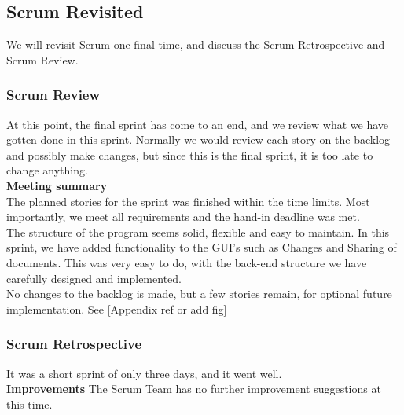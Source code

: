 \subsection{Scrum Revisited}
We will revisit Scrum one final time, and discuss the Scrum Retrospective and Scrum Review.
\subsubsection{Scrum Review}
At this point, the final sprint has come to an end, and we review what we have gotten done in this sprint. Normally we would review each story on the backlog and possibly make changes, but since this is the final sprint, it is too late to change anything.\\
\newline
\textbf{Meeting summary}\\
The planned stories for the sprint was finished within the time limits. Most importantly, we meet all requirements and the hand-in deadline was met.\\
The structure of the program seems solid, flexible and easy to maintain. In this sprint, we have added functionality to the GUI's such as Changes and Sharing of documents. This was very easy to do, with the back-end structure we have carefully designed and implemented.\\
\newline
No changes to the backlog is made, but a few stories remain, for optional future implementation. See [Appendix ref or add fig]
\subsubsection{Scrum Retrospective}
It was a short sprint of only three days, and it went well.\\
\newline
\textbf{Improvements}
The Scrum Team has no further improvement suggestions at this time.\\